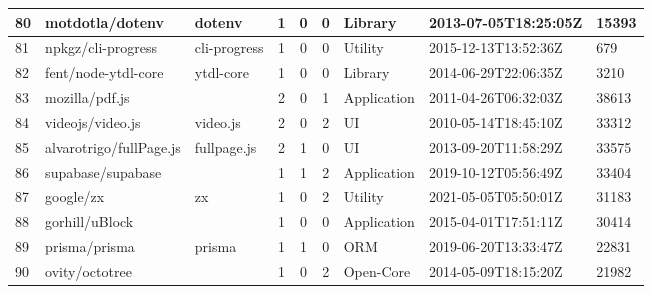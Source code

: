 \begin{landscape}
\begin{table}[]
{\begin{tabular}{lllccclll}
                80  & motdotla/dotenv                  & dotenv                 & 1                      & 0                 & 0                 & Library           & 2013-07-05T18:25:05Z & 15393          \\ \hline
                81  & npkgz/cli-progress               & cli-progress           & 1                      & 0                 & 0                 & Utility           & 2015-12-13T13:52:36Z & 679            \\ \hline
                82  & fent/node-ytdl-core              & ytdl-core              & 1                      & 0                 & 0                 & Library           & 2014-06-29T22:06:35Z & 3210           \\ \hline
                83  & mozilla/pdf.js                   &                        & 2                      & 0                 & 1                 & Application       & 2011-04-26T06:32:03Z & 38613          \\ \hline
                84  & videojs/video.js                 & video.js               & 2                      & 0                 & 2                 & UI                & 2010-05-14T18:45:10Z & 33312          \\ \hline
                85  & alvarotrigo/fullPage.js          & fullpage.js            & 2                      & 1                 & 0                 & UI                & 2013-09-20T11:58:29Z & 33575          \\ \hline
                86  & supabase/supabase                &                        & 1                      & 1                 & 2                 & Application       & 2019-10-12T05:56:49Z & 33404          \\ \hline
                87  & google/zx                        & zx                     & 1                      & 0                 & 2                 & Utility           & 2021-05-05T05:50:01Z & 31183          \\ \hline
                88  & gorhill/uBlock                   &                        & 1                      & 0                 & 0                 & Application       & 2015-04-01T17:51:11Z & 30414          \\ \hline
                89  & prisma/prisma                    & prisma                 & 1                      & 1                 & 0                 & ORM               & 2019-06-20T13:33:47Z & 22831          \\ \hline
                90  & ovity/octotree                   &                        & 1                      & 0                 & 2                 & Open-Core         & 2014-05-09T18:15:20Z & 21982          \\ \hline

\end{tabular}}
\end{table}
\end{landscape}

